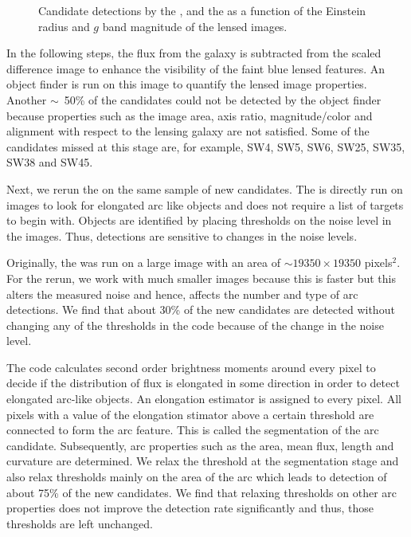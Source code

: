 \documentclass[useAMS,usenatbib,a4paper]{mn2e}
\begin{document}
\begin{figure}
\begin{center}
\caption{ \label{fig:stackremg}
Candidate detections by the \rf, \sw and the \af as a
function of the Einstein radius and $g$ band magnitude of the lensed
images.
}
\end{center}
\end{figure}

In the following steps, the flux from the galaxy is subtracted from the
scaled difference image to enhance the visibility of the faint blue
lensed features. An object finder is run on this image to quantify the
lensed image properties. Another $\sim$~50\% of the \sw candidates could not be
detected by the object finder because properties such as the image area,
axis ratio, magnitude/color and alignment with respect to the lensing
galaxy are not satisfied. Some of the candidates missed at this stage
are, for example, SW4, SW5, SW6, SW25, SW35, SW38 and SW45.


Next, we rerun the \af on the same \sw sample of new candidates. The \af
is directly run on images to look for elongated arc like objects and does
not require a list of targets to begin with. Objects are identified by
placing thresholds on the noise level in the images. Thus, \af
detections are sensitive to changes in the noise levels.

Originally, the \af was run on a large image with an area of $\sim 19350
\times 19350$ pixels$^2$. For the rerun, we work with much smaller
images because this is faster but this alters the measured
noise and hence, affects the number and type of arc detections. We find
that about 30\% of the new candidates are detected without changing any
of the thresholds in the code because of the change in the noise level.

The \af code calculates second order brightness moments around every
pixel to decide if the distribution of flux is elongated in some
direction in order to detect elongated arc-like objects. An elongation
estimator is assigned to every pixel. All pixels with a value of the
elongation stimator above a certain threshold are connected to form the arc
feature. This is called the segmentation of the arc candidate. Subsequently, arc
properties such as the area, mean flux, length and curvature are
determined. We relax the threshold at the segmentation stage and also relax
thresholds mainly on the area of the arc which leads to detection of
about 75\% of the new \sw candidates. We find that relaxing thresholds
on other arc properties does not improve the detection rate significantly
and thus, those thresholds are left unchanged.
\end{document}
